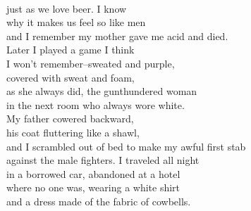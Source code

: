 \documentclass[smalldemyvopaper,11pt,twoside,onecolumn,openright,extrafontsizes]{memoir}
\begin{document}
\\just as we love beer. I know
\\why it makes us feel so like men
\\and I remember my mother gave me acid and died.
\\Later I played a game I think
\\I won't remember--sweated and purple,
\\covered with sweat and foam,
\\as she always did, the gunthundered woman
\\in the next room who always wore white.
\\My father cowered backward,
\\his coat fluttering like a shawl,
\\and I scrambled out of bed to make my awful first stab
\\against the male fighters. I traveled all night
\\in a borrowed car, abandoned at a hotel
\\where no one was, wearing a white shirt
\\and a dress made of the fabric of cowbells.
\end{document}
